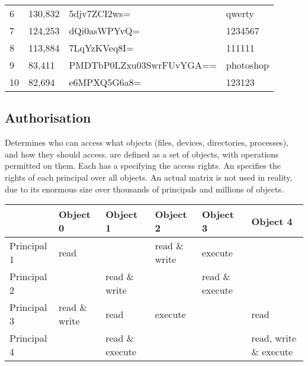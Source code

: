 \documentclass{report}
\begin{document}
{{{\begin{center}
\begin{tabular}{l l l l}
			6              & 130,832        & 5djv7ZCI2ws=             & qwerty             \\
			7              & 124,253        & dQi0asWPYvQ=             & 1234567            \\
			8              & 113,884        & 7LqYzKVeq8I=             & 111111             \\
			9              & 83,411         & PMDTbP0LZxu03SwrFUvYGA== & photoshop          \\
			10             & 82,694         & e6MPXQ5G6a8=             & 123123             \\
		\end{tabular}
	\end{center}
}

\subsection*{Authorisation}
Determines who can access what objects (files, devices, directories, processes), and how they should access.
 are defined as a set of objects, with operations permitted on them. Each  has a  specifying the access rights.
An  specifies the rights of each principal over all objects. An actual matrix is not used in reality, due to its enormous size over thousands of principals and millions of objects.
\begin{center}
	\begin{tabular}{ |l | l | l | l | l | l |}
		\hline
		            & Object 0      & Object 1        & Object 2      & Object 3        & Object 4               \\
		\hline
		Principal 1 & read          &                 & read \& write & execute         &                        \\
		Principal 2 &               & read \& write   &               & read \& execute &                        \\
		Principal 3 & read \& write & read            & execute       &                 & read                   \\
		Principal 4 &               & read \& execute &               &                 & read, write \& execute \\
		\hline
	\end{tabular}
\end{center}
}}
\end{document}
